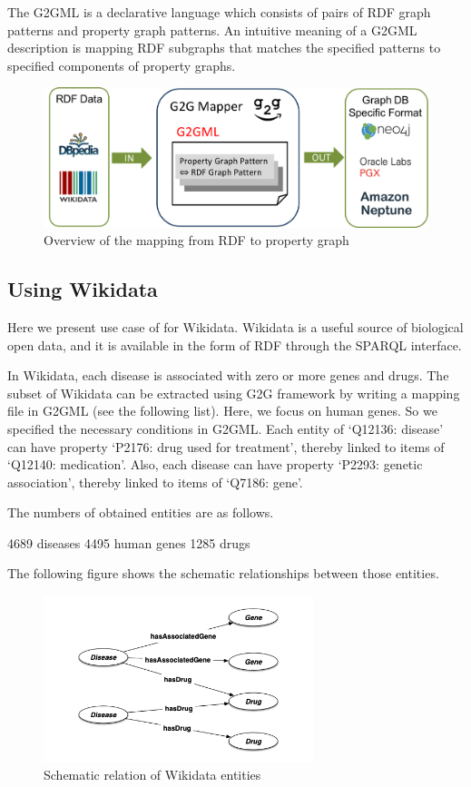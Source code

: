 \documentclass[runningheads]{llncs}
\begin{document}
The G2GML is a declarative language which consists of pairs of RDF graph patterns and property graph patterns. 
An intuitive meaning of a G2GML description is mapping RDF subgraphs that matches the specified patterns to specified components of property graphs.


\begin{figure}
\center
\includegraphics[width=1.0\textwidth]{dataflow.png}
\caption{Overview of the mapping from RDF to property graph}
\label{fig:dataflow}
\end{figure}




\subsection{Using Wikidata}

Here we present use case of for Wikidata.
Wikidata is a useful source of biological open data, and it is available in the form of RDF through the SPARQL interface.

In Wikidata, each disease is associated with zero or more genes and drugs.
The subset of Wikidata can be extracted using G2G framework by writing a mapping file in G2GML (see the following list).
Here, we focus on human genes. So we specified the necessary conditions in G2GML.
Each entity of ‘Q12136: disease’ can have property ‘P2176: drug used for treatment’, thereby linked to items of ‘Q12140: medication’. Also, each disease can have property ‘P2293: genetic association’, thereby linked to items of ‘Q7186: gene’.

The numbers of obtained entities are as follows.

4689 diseases
4495 human genes
1285 drugs

The following figure shows the schematic relationships between those entities.


\begin{figure}
\center
\includegraphics[width=0.7\textwidth]{wikidata_schema.png}
\caption{Schematic relation of Wikidata entities}
\label{fig:wikidata_schema.png}
\end{figure}
\end{document}
